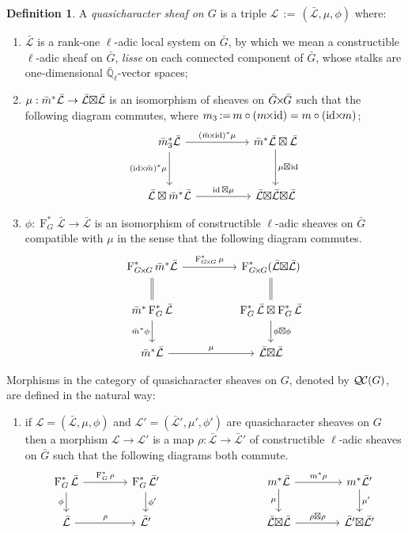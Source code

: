 \documentclass{amsart}
\makeatletter
\theoremstyle{plain}
\theoremstyle{definition}
\newtheorem{definition}[theorem]{Definition}
\theoremstyle{remark}
\newcommand{\EE}{\mathbb{\bar Q}_\ell}
\newcommand{\Frob}[1]{\operatorname{F}_{#1}}
\DeclareMathOperator{\id}{id}
\newcommand{\ceq}{{\, :=\, }}
\newcommand{\qcs}[1]{{\mathcal{#1}}}
\newcommand{\gqcs}[1]{{\mathcal{\bar #1}}}
\newcommand{\QC}{{\mathcal{Q\hskip-0.8pt C}}}
\newcommand{\labitem}[2]{
\def\@itemlabel{\textbf{#1}}
\item
\def\@currentlabel{#1}\label{#2}}
\newcommand{\bm}{\bar{m}}
\newcommand{\bG}{\bar{G}}
\newcommand{\tight}[3]{\hspace{-#1pt}{#2}\hspace{-#3pt}}
\newcommand{\bGxG}{\text{$\bar{G} \tight{1}{\times}{1} \bar{G}$}}
\newcommand{\GxxG}{\text{$G \tight{1}{\times}{1} G$}}
\newcommand{\LxL}{\text{$\gqcs{L} \tight{0}{\boxtimes}{0} \gqcs{L}$}}
\makeatother
\begin{document}
\begin{definition}\label{def:QC}
A \emph{quasicharacter sheaf on $G$} is a triple
$\qcs{L}\ceq (\gqcs{L},\mu,\phi)$ where:
\begin{enumerate}
\labitem{(QC.1)}{QC.1} $\gqcs{L}$ is a rank-one $\ell$-adic local system on $\bG$, by which we mean a constructible $\ell$-adic sheaf on $\bG$, {\it lisse} on each connected component of $\bG$, whose stalks are one-dimensional $\EE$-vector spaces;
\labitem{(QC.2)}{QC.2} $\mu: \bm^* \gqcs{L} \to \LxL$ is an isomorphism of
sheaves on $\bGxG$ such that the following diagram commutes,
  where $m_3 \ceq m\circ (m\tight{1}{\times}{2}\id) = m\circ (\id\tight{2}{\times}{1} m)$;
  \[
  \begin{tikzcd}[row sep=30]
  \bm_3^*\gqcs{L} \arrow{rr}{(\bm \tight{1}{\times}{2} \id)^*\mu} \arrow[swap]{d}{(\id \tight{2}{\times}{1} \bm)^*\mu}
    &&  \bm^*\gqcs{L} \boxtimes \gqcs{L} \dar{\mu \tight{0}{\boxtimes}{1} \id} \\
    \gqcs{L} \boxtimes \bm^* \gqcs{L} \arrow{rr}{\id \boxtimes \mu}
    &&  \gqcs{L} \tight{0}{\boxtimes}{0} \LxL
  \end{tikzcd}
  \]
\labitem{(QC.3)}{QC.3} $\phi : \Frob{G}^* \gqcs{L} \to \gqcs{L}$ is an
  isomorphism of constructible $\ell$-adic sheaves on $\bG$ compatible with
  $\mu$ in the sense that the following diagram commutes.
  \[
  \begin{tikzcd}[row sep=20]
  \Frob{\GxxG}^* \bm^* \gqcs{L} \arrow{rr}{\Frob{\GxxG}^*\mu}
    && \Frob{\GxxG}^*(\LxL)\\
    \arrow[equal]{u} \bm^*  \Frob{G}^* \gqcs{L} \arrow[swap]{d}{\bm^* \phi}
    && \Frob{G}^*\gqcs{L}\boxtimes \Frob{G}^*\gqcs{L} \dar{\phi\boxtimes \phi} \arrow[equal]{u} \\
    \bm^*\gqcs{L} \arrow{rr}{\mu}
    && \LxL
  \end{tikzcd}
  \]
\end{enumerate}
\end{definition}

Morphisms in the category of quasicharacter sheaves on $G$, denoted by $\QC(G)$, are defined in the natural way:
\begin{enumerate}
\labitem{(QC.4)}{QC.4} if $\qcs{L} = (\gqcs{L},\mu,\phi)$ and
  $\qcs{L'} = (\gqcs{L'},\mu',\phi')$ are quasicharacter sheaves on $G$ then
  a morphism $\qcs{L} \to \qcs{L}'$ is a map $\rho : \gqcs{L} \to \gqcs{L'}$
  of constructible $\ell$-adic sheaves on $\bG$ such that the following diagrams both commute.
  \[
  \begin{tikzcd}[column sep=40]
  \Frob{G}^* \gqcs{L} \rar{\Frob{G}^* \rho} \arrow[swap]{d}{\phi} & \Frob{G}^* \gqcs{L'} \dar{\phi'}
  & & \arrow[swap]{d}{\mu} m^* \gqcs{L} \rar{m^* \rho} & m^* \gqcs{L'} \dar{\mu'} \\
  \gqcs{L} \rar{\rho} & \gqcs{L'}
  & {} & \LxL \rar{\tight{1}{\rho\boxtimes \rho}{1}} & \gqcs{L'} \tight{0}{\boxtimes}{0} \gqcs{L'}
  \end{tikzcd}
  \]
\end{enumerate}
\end{document}
